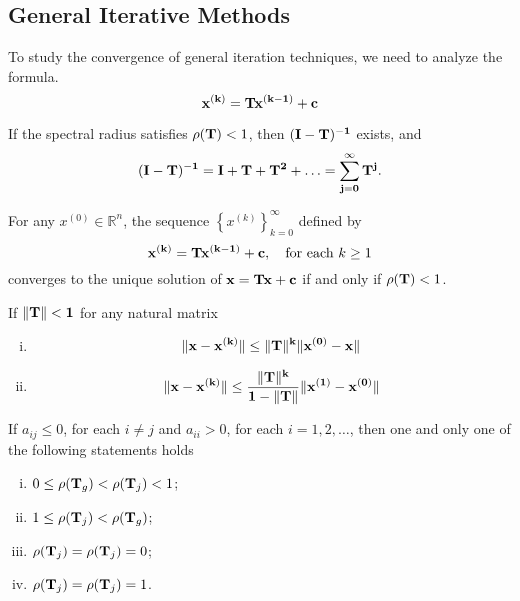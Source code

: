 \subsection{General Iterative Methods}
To study the convergence of general iteration techniques, we need to analyze the formula.
\[
\bf x^{(k)} = Tx^{(k-1)}+c
\]
\begin{lemma}
If the spectral radius satisfies $\rho({\bf T})<1$, then $\bf (I-T)^{-1}$ exists, and
\[
\bf (I-T)^{-1} = I+T+T^2+\ldots=\sum_{j=0}^\infty T^j.
\]
\end{lemma}
\begin{theo}
For any $x^{(0)}\in\mathbb{R}^n$, the sequence $\left\{x^{(k)}\right\}_{k=0}^\infty$ defined by
\[
\bf x^{(k)} = Tx^{(k-1)}+c,\quad\text{for each $k\geq 1$}
\]
converges to the unique solution of $\bf x=Tx+c$ if and only if $\rho({\bf T})<1$.
\end{theo}
\begin{coro}
If $\|\bf T\|<1$ for any natural matrix
\begin{enumerate}[(i)]
    \item \[\bf \|x-x^{(k)}\|\leq\|T\|^k\|x^{(0)}-x\|\]
    \item \[\bf \|x-x^{(k)}\|\leq\frac{\|T\|^k}{1-\|T\|}\|x^{(1)}-x^{(0)}\|\]
\end{enumerate}
\end{coro}
\begin{theo}
If $a_{ij}\leq 0$, for each $i\neq j$ and $a_{ii}>0$, for each $i=1,2,\ldots$, then one and only one of the following statements holds
\begin{enumerate}[(i)]
    \item $0\leq \rho({\bf T}_g)<\rho({\bf T}_j)<1$;
    \item $1\leq \rho({\bf T}_j)<\rho({\bf T}_g)$;
    \item $\rho({\bf T}_j)=\rho({\bf T}_j)=0$;
    \item $\rho({\bf T}_j)=\rho({\bf T}_j)=1$.
\end{enumerate}
\end{theo}